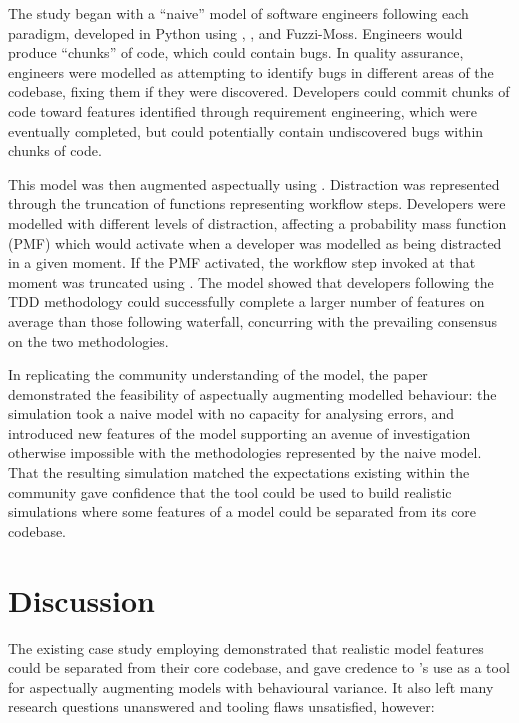 The study began with a ``naive'' model of software engineers following each
paradigm, developed in Python using \pdsf{}, \theatreag{}, and Fuzzi-Moss. Engineers
would produce ``chunks'' of code, which could contain bugs. In quality
assurance, engineers were modelled as attempting to identify bugs in different
areas of the codebase, fixing them if they were discovered. Developers could
commit chunks of code toward features identified through requirement
engineering, which were eventually completed, but could potentially contain
undiscovered bugs within chunks of code.

This model was then augmented aspectually using \pdsf{}. Distraction was
represented through the truncation of functions representing workflow steps.
Developers were modelled with different levels of distraction, affecting a
probability mass function (PMF) which would activate when a developer was
modelled as being distracted in a given moment. If the PMF activated, the
workflow step invoked at that moment was truncated using \pdsf{}. The model showed
that developers following the TDD methodology could successfully complete a
larger number of features on average than those following waterfall, concurring
with the prevailing consensus on the two methodologies. 

In replicating the community understanding of the model, the paper demonstrated
the feasibility of aspectually augmenting modelled behaviour: the simulation
took a naive model with no capacity for analysing errors, and introduced new
features of the model supporting an avenue of investigation otherwise
impossible with the methodologies represented by the naive model. That the
resulting simulation matched the expectations existing within the community gave
confidence that the tool could be used to build realistic simulations where
some features of a model could be separated from its core codebase.


\section{Discussion}\label{sec:prior_work_discussion}

The existing case study employing \pdsf demonstrated that realistic model
features could be separated from their core codebase, and gave credence to
\pdsf{}'s use as a tool for aspectually augmenting models with behavioural
variance. It also left many research questions unanswered and tooling
flaws unsatisfied, however:

